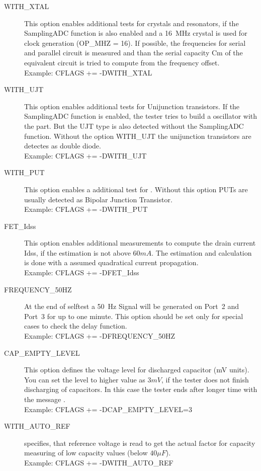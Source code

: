 \begin{description}
  \item[WITH\_XTAL]
This option enables additional tests for crystals and resonators, if the SamplingADC function is also enabled and
a 16~MHz crystal is used for clock generation (OP\_MHZ = 16).
If possible, the frequencies for serial and parallel circuit is measured and than the serial capacity Cm of the
equivalent circuit is tried to compute from the frequency offset.\\
Example: CFLAGS += -DWITH\_XTAL

  \item[WITH\_UJT]
This option enables additional tests for  Unijunction transistors. 
If the SamplingADC function is enabled, the tester tries to build a oscillator with the part.
But the UJT type is also detected without the SamplingADC function.
Without the option WITH\_UJT the unijunction transistors are detectes as double diode.\\
Example: CFLAGS += -DWITH\_UJT

  \item[WITH\_PUT]
This option enables a additional test for .
Without this option PUTs are usually detected as Bipolar Junction Transistor.\\
Example: CFLAGS += -DWITH\_PUT

 \item[FET\_Idss]
This option enables additional measurements to compute the drain current Idss, if the estimation is not
above \(60mA\). The estimation and calculation is done with a assumed quadratical current propagation.\\
Example: CFLAGS += -DFET\_Idss

  \item[FREQUENCY\_50HZ] At the end of selftest a 50~Hz Signal will be generated on Port~2 and Port~3 for up to one minute.
 This option should be set only for special cases to check the delay function.\\
Example: CFLAGS += -DFREQUENCY\_50HZ

  \item[CAP\_EMPTY\_LEVEL]  This option defines the voltage level for discharged capacitor (mV units).
You can set the level to higher value as \(3mV\), if the tester does not finish discharging of capacitors.
In this case the tester ends after longer time with the message .\\
Example: CFLAGS += -DCAP\_EMPTY\_LEVEL=3

  \item[WITH\_AUTO\_REF] specifies, that reference voltage is read to get the actual factor for capacity measuring of low capacity values (below \(40\mu F\)).\\
Example:  CFLAGS += -DWITH\_AUTO\_REF


\end{description}
